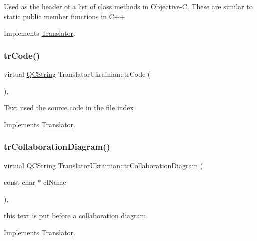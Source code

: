 Used as the header of a list of class methods in Objective-\/C. These are similar to static public member functions in C++. 

Implements \mbox{\hyperlink{class_translator}{Translator}}.

\mbox{\label{class_translator_ukrainian_a2557dba0757dba7012ab7c039f7eb228}} 
\subsubsection{\texorpdfstring{trCode()}{trCode()}}
{\footnotesize\ttfamily virtual \mbox{\hyperlink{class_q_c_string}{Q\+C\+String}} Translator\+Ukrainian\+::tr\+Code (\begin{DoxyParamCaption}{ }\end{DoxyParamCaption})\hspace{0.3cm}{\ttfamily [inline]}, {\ttfamily [virtual]}}

Text used the source code in the file index 

Implements \mbox{\hyperlink{class_translator}{Translator}}.

\mbox{\label{class_translator_ukrainian_a10ec62b4fb9229ba7421894fce921149}} 
\subsubsection{\texorpdfstring{trCollaborationDiagram()}{trCollaborationDiagram()}}
{\footnotesize\ttfamily virtual \mbox{\hyperlink{class_q_c_string}{Q\+C\+String}} Translator\+Ukrainian\+::tr\+Collaboration\+Diagram (\begin{DoxyParamCaption}\item[{const char $\ast$}]{cl\+Name }\end{DoxyParamCaption})\hspace{0.3cm}{\ttfamily [inline]}, {\ttfamily [virtual]}}

this text is put before a collaboration diagram 

Implements \mbox{\hyperlink{class_translator}{Translator}}.

\mbox{\label{class_translator_ukrainian_afa6c32e7685ca20fed4bd40167020169}} 
